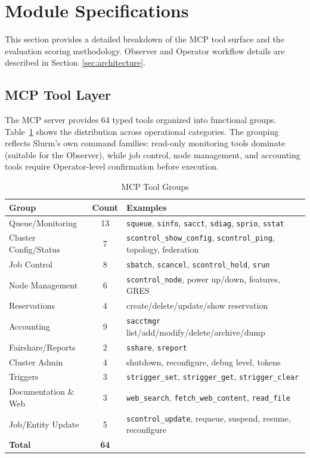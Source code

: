 \section{Module Specifications}
\label{sec:module-specifications}

This section provides a detailed breakdown of the MCP tool surface and the evaluation scoring methodology. Observer and Operator workflow details are described in Section~\ref{sec:architecture}.

\subsection{MCP Tool Layer}

The MCP server provides 64 typed tools organized into functional groups. Table~\ref{tab:mcp-tool-groups} shows the distribution across operational categories. The grouping reflects Slurm's own command families: read-only monitoring tools dominate (suitable for the Observer), while job control, node management, and accounting tools require Operator-level confirmation before execution.

\begin{table}[H]
    \centering
    \caption{MCP Tool Groups}
    \label{tab:mcp-tool-groups}
    \small
    \begin{tabular}{|l|c|l|}
        \hline
        \textbf{Group} & \textbf{Count} & \textbf{Examples} \\
        \hline
        Queue/Monitoring & 13 & \texttt{squeue}, \texttt{sinfo}, \texttt{sacct}, \texttt{sdiag}, \texttt{sprio}, \texttt{sstat} \\
        Cluster Config/Status & 7 & \texttt{scontrol\_show\_config}, \texttt{scontrol\_ping}, topology, federation \\
        Job Control & 8 & \texttt{sbatch}, \texttt{scancel}, \texttt{scontrol\_hold}, \texttt{srun} \\
        Node Management & 6 & \texttt{scontrol\_node}, power up/down, features, GRES \\
        Reservations & 4 & create/delete/update/show reservation \\
        Accounting & 9 & \texttt{sacctmgr} list/add/modify/delete/archive/dump \\
        Fairshare/Reports & 2 & \texttt{sshare}, \texttt{sreport} \\
        Cluster Admin & 4 & shutdown, reconfigure, debug level, tokens \\
        Triggers & 3 & \texttt{strigger\_set}, \texttt{strigger\_get}, \texttt{strigger\_clear} \\
        Documentation \& Web & 3 & \texttt{web\_search}, \texttt{fetch\_web\_content}, \texttt{read\_file} \\
        Job/Entity Update & 5 & \texttt{scontrol\_update}, requeue, suspend, resume, reconfigure \\
        \hline
        \textbf{Total} & \textbf{64} & \\
        \hline
    \end{tabular}
\end{table}

